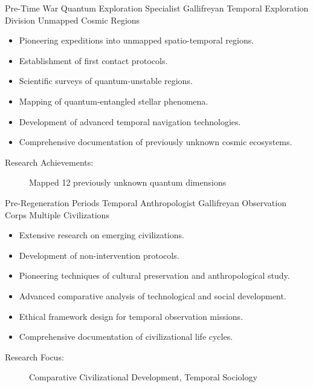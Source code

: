 \begin{cvsubentries}
 \cvsubentry
  {Pre-Time War}%
  {Quantum Exploration Specialist}%
  {Gallifreyan Temporal Exploration Division}%
  {Unmapped Cosmic Regions}%
  {%
    \begin{itemize}
      \item Pioneering expeditions into unmapped spatio-temporal regions.
      \item Establishment of first contact protocols.
      \item Scientific surveys of quantum-unstable regions.
      \item Mapping of quantum-entangled stellar phenomena.
      \item Development of advanced temporal navigation technologies.
      \item Comprehensive documentation of previously unknown cosmic ecosystems.
    \end{itemize}
  }{%
    \begin{description}%
      \item[Research Achievements:] Mapped 12 previously unknown quantum dimensions
    \end{description}%
  }
\end{cvsubentries}

\cventry
{Pre-Regeneration Periods}%
{Temporal Anthropologist}%
{Gallifreyan Observation Corps}%
{Multiple Civilizations}%
{%
  \begin{itemize}
    \item Extensive research on emerging civilizations.
    \item Development of non-intervention protocols.
    \item Pioneering techniques of cultural preservation and anthropological study.
    \item Advanced comparative analysis of technological and social development.
    \item Ethical framework design for temporal observation missions.
    \item Comprehensive documentation of civilizational life cycles.
  \end{itemize}
}{%
  \begin{description}%
    \item[Research Focus:] Comparative Civilizational Development, Temporal Sociology
  \end{description}%
}

